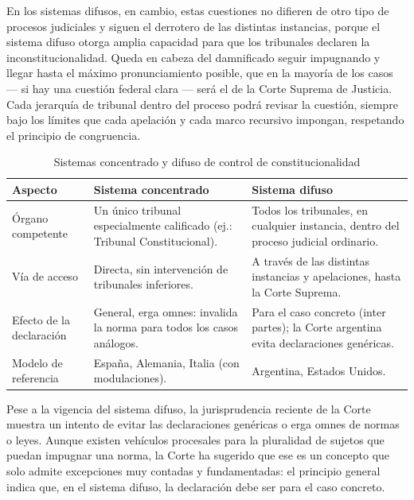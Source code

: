\documentclass[12pt,oneside]{book}
\begin{document}
En los sistemas difusos, en cambio, estas cuestiones no difieren de otro tipo de procesos judiciales y siguen el derrotero de las distintas instancias, porque el sistema difuso otorga amplia capacidad para que los tribunales declaren la inconstitucionalidad. Queda en cabeza del damnificado seguir impugnando y llegar hasta el máximo pronunciamiento posible, que en la mayoría de los casos --- si hay una cuestión federal clara --- será el de la Corte Suprema de Justicia. Cada jerarquía de tribunal dentro del proceso podrá revisar la cuestión, siempre bajo los límites que cada apelación y cada marco recursivo impongan, respetando el principio de congruencia.

\begin{table}[H]
\centering
\caption{Sistemas concentrado y difuso de control de constitucionalidad}
\begin{tabularx}{\textwidth}{>{\raggedright\arraybackslash}p{} X X}
\toprule
\textbf{Aspecto} & \textbf{Sistema concentrado} & \textbf{Sistema difuso} \\
\midrule
Órgano competente & Un único tribunal especialmente calificado (ej.: Tribunal Constitucional). & Todos los tribunales, en cualquier instancia, dentro del proceso judicial ordinario. \\
Vía de acceso & Directa, sin intervención de tribunales inferiores. & A través de las distintas instancias y apelaciones, hasta la Corte Suprema. \\
Efecto de la declaración & General, erga omnes: invalida la norma para todos los casos análogos. & Para el caso concreto (inter partes); la Corte argentina evita declaraciones genéricas. \\
Modelo de referencia & España, Alemania, Italia (con modulaciones). & Argentina, Estados Unidos. \\
\bottomrule
\end{tabularx}
\end{table}

\begin{note}
Pese a la vigencia del sistema difuso, la jurisprudencia reciente de la Corte muestra un intento de evitar las declaraciones genéricas o erga omnes de normas o leyes. Aunque existen vehículos procesales para la pluralidad de sujetos que puedan impugnar una norma, la Corte ha sugerido que ese es un concepto que solo admite excepciones muy contadas y fundamentadas: el principio general indica que, en el sistema difuso, la declaración debe ser para el caso concreto.
\end{note}
\end{document}
